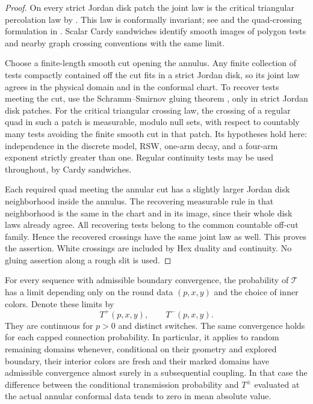 \begin{proof}
On every strict Jordan disk patch the joint law is the critical triangular
percolation law by \cite[Sections 3--4]{V}.  This law is conformally
invariant; see \cite[Theorems 1 and 7]{CN} and the quad-crossing
formulation in \cite[Section 2.3]{GPS}.  Scalar Cardy sandwiches identify smooth images of polygon
tests and nearby graph crossing conventions with the same limit.

Choose a finite-length smooth cut opening the annulus.  Any finite
collection of tests compactly contained off the cut fits in a strict
Jordan disk, so its joint law agrees in the physical domain and in the
conformal chart.  To recover tests meeting the cut, use the
Schramm--Smirnov gluing theorem
\cite[Theorem 1.19 and Proposition 4.1]{SS}, only in strict Jordan disk
patches.  For the critical triangular crossing law, the crossing of a
regular quad in such a patch is measurable, modulo null sets, with
respect to countably many tests avoiding the finite smooth cut in that
patch.  Its hypotheses hold here: independence in the discrete model,
RSW, one-arm decay, and a four-arm exponent strictly greater than one.
Regular continuity tests may be used throughout, by Cardy sandwiches.

Each required quad meeting the annular cut has a slightly larger Jordan
disk neighborhood inside the annulus.  The recovering measurable rule
in that neighborhood is the same in the chart and in its image, since
their whole disk laws already agree.  All recovering tests belong to the
common countable off-cut family.  Hence the recovered crossings have the
same joint law as well.  This proves the assertion.  White crossings are
included by Hex duality and continuity.  No gluing assertion along a rough
slit is used.
\end{proof}

\begin{proposition}\label{an:limit}
For every sequence with admissible boundary convergence, the probability
of $\mathcal T$ has a limit depending only on the round data $(p,x,y)$ and
the choice of inner colors.  Denote these limits by
\[
 T^+(p,x,y),\qquad T^-(p,x,y).
\]
They are continuous for $p>0$ and distinct switches.  The same convergence
holds for each capped connection probability.  In particular, it applies
to random remaining domains whenever, conditional on their geometry and
explored boundary, their interior colors are fresh and their marked
domains have admissible convergence almost surely in a subsequential
coupling.  In that case the difference between the conditional
transmission probability and $T^\pm$ evaluated at the actual annular
conformal data tends to zero in mean absolute value.
\end{proposition}

